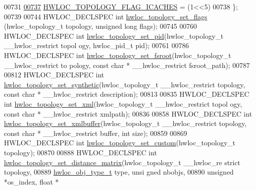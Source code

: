 \begin{DoxyCode}
00731 
\hypertarget{a00033_source_l00737}{}\hyperlink{a00044_ggada025d3ec20b4b420f8038d23d6e7bdeaae509a0bed4a7067e0116c75c661178d}{00737}   \hyperlink{a00044_ggada025d3ec20b4b420f8038d23d6e7bdeaae509a0bed4a7067e0116c75c661178d}{HWLOC_TOPOLOGY_FLAG_ICACHES} = (1<<5)
00738 \};
00739 
00744 HWLOC\_DECLSPEC \textcolor{keywordtype}{int} \hyperlink{a00044_ga6d11e53db143ac39c32cdb3912b71f99}{hwloc_topology_set_flags} (hwloc\_topology\_t topology, \textcolor{keywordtype}{unsigned} 
      \textcolor{keywordtype}{long} flags);
00745 
00760 HWLOC\_DECLSPEC \textcolor{keywordtype}{int} \hyperlink{a00044_gae1100de0162b3c6a9db750ac14629c05}{hwloc_topology_set_pid}(hwloc\_topology\_t \_\_hwloc\_restrict topol
      ogy, hwloc\_pid\_t pid);
00761 
00786 HWLOC\_DECLSPEC \textcolor{keywordtype}{int} \hyperlink{a00044_ga2f6bfb6958d8b508ea1d7d5bb266432c}{hwloc_topology_set_fsroot}(hwloc\_topology\_t \_\_hwloc\_restrict to
      pology, \textcolor{keyword}{const} \textcolor{keywordtype}{char} * \_\_hwloc\_restrict fsroot\_path);
00787 
00812 HWLOC\_DECLSPEC \textcolor{keywordtype}{int} \hyperlink{a00044_ga2fcb52181b586c20f001b7a999550324}{hwloc_topology_set_synthetic}(hwloc\_topology\_t \_\_hwloc\_restrict
       topology, \textcolor{keyword}{const} \textcolor{keywordtype}{char} * \_\_hwloc\_restrict description);
00813 
00835 HWLOC\_DECLSPEC \textcolor{keywordtype}{int} \hyperlink{a00044_ga93efcc8a962afe1ed23393700682173f}{hwloc_topology_set_xml}(hwloc\_topology\_t \_\_hwloc\_restrict topol
      ogy, \textcolor{keyword}{const} \textcolor{keywordtype}{char} * \_\_hwloc\_restrict xmlpath);
00836 
00858 HWLOC\_DECLSPEC \textcolor{keywordtype}{int} \hyperlink{a00044_gae7e4bade144652a2b48f5eaf0309b4ec}{hwloc_topology_set_xmlbuffer}(hwloc\_topology\_t \_\_hwloc\_restrict
       topology, \textcolor{keyword}{const} \textcolor{keywordtype}{char} * \_\_hwloc\_restrict buffer, \textcolor{keywordtype}{int} size);
00859 
00869 HWLOC\_DECLSPEC \textcolor{keywordtype}{int} \hyperlink{a00044_ga12024fec46f9368fb8fc5c624089c5ec}{hwloc_topology_set_custom}(hwloc\_topology\_t topology);
00870 
00888 HWLOC\_DECLSPEC \textcolor{keywordtype}{int} \hyperlink{a00044_gabda6afa67a495cd652f064ad51d3fe47}{hwloc_topology_set_distance_matrix}(hwloc\_topology\_t \_\_hwloc\_re
      strict topology,
00889                                                       \hyperlink{a00041_gacd37bb612667dc437d66bfb175a8dc55}{hwloc_obj_type_t} type, \textcolor{keywordtype}{unsi
      gned} nbobjs,
00890                                                       \textcolor{keywordtype}{unsigned} *os\_index, \textcolor{keywordtype}{float} *

\end{DoxyCode}
